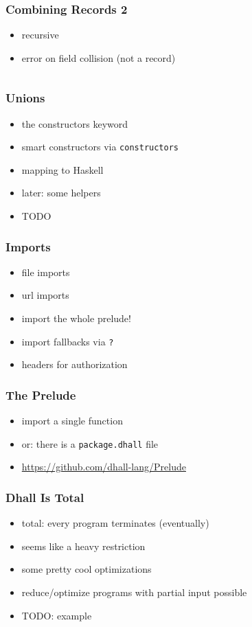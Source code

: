 \documentclass{beamer}
\begin{document}
 \begin{frame}[fragile]
   \frametitle{Combining Records 2}
   \begin{itemize}
   \item recursive
   \item error on field collision (not a record)
   \end{itemize}
   \inputminted{text}{static-source/records-combine2.out}
 \end{frame}

  \begin{frame}
   \frametitle{Unions}
   \begin{itemize}
   \item the constructors keyword
   \item smart constructors via \texttt{constructors}
   \item mapping to Haskell
   \item later: some helpers
   \item TODO
   \end{itemize}
 \end{frame}

 \begin{frame}
   \frametitle{Imports}
   \begin{itemize}
   \item file imports
   \item url imports
   \item import the whole prelude!
   \item import fallbacks via \texttt{?}
   \item headers for authorization
   \end{itemize}
 \end{frame}

 \begin{frame}
   \frametitle{The Prelude}
   \begin{itemize}
   \item import a single function
   \item or: there is a \texttt{package.dhall} file
   \item \url{https://github.com/dhall-lang/Prelude}
   \end{itemize}
 \end{frame}

 \begin{frame}
   \frametitle{Dhall Is Total}
   \begin{itemize}
   \item total: every program terminates (eventually)
   \item seems like a heavy restriction
   \item some pretty cool optimizations
   \item reduce/optimize programs with partial input possible
   \item TODO: example
   \end{itemize}
 \end{frame}
\end{document}
